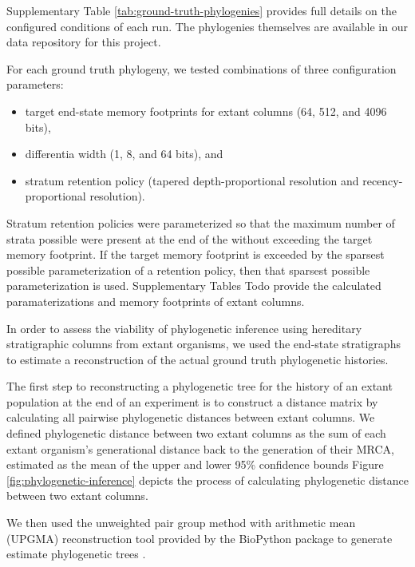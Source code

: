 Supplementary Table \ref{tab:ground-truth-phylogenies} provides full details on the configured conditions of each run.
The phylogenies themselves are available in our data repository for this project.

For each ground truth phylogeny, we tested combinations of three configuration parameters:
\begin{itemize}
  \item target end-state memory footprints for extant columns (64, 512, and 4096 bits),
  \item differentia width (1, 8, and 64 bits), and
  \item stratum retention policy (tapered depth-proportional resolution and recency-proportional resolution).
\end{itemize}

Stratum retention policies were parameterized so that the maximum number of strata possible were present at the end of the without exceeding the target memory footprint.
If the target memory footprint is exceeded by the sparsest possible parameterization of a retention policy, then that sparsest possible parameterization is used.
Supplementary Tables Todo provide the calculated paramaterizations and memory footprints of extant columns.

In order to assess the viability of phylogenetic inference using hereditary stratigraphic columns from extant organisms, we used the end-state stratigraphs to estimate a reconstruction of the actual ground truth phylogenetic histories.



The first step to reconstructing a phylogenetic tree for the history of an extant population at the end of an experiment is to construct a distance matrix by calculating all pairwise phylogenetic distances between extant columns.
We defined phylogenetic distance between two extant columns as the sum of each extant organism's generational distance back to the generation of their MRCA, estimated as the mean of the upper and lower 95\% confidence bounds
Figure \ref{fig:phylogenetic-inference} depicts the process of calculating phylogenetic distance between two extant columns.

We then used the unweighted pair group method with arithmetic mean (UPGMA) reconstruction tool provided by the BioPython package to generate estimate phylogenetic trees \citep{cock2009biopython,sokal1958statistical}.

